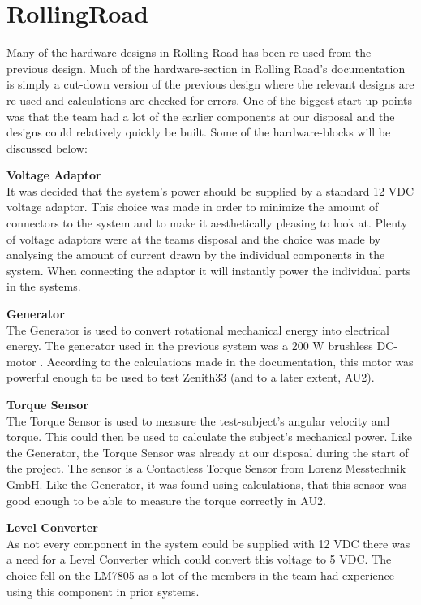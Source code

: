\section{RollingRoad} 
Many of the hardware-designs in Rolling Road has been re-used from the previous design\cite{BAC_rullefelt}. Much of the hardware-section in Rolling Road's documentation\cite{RR} is simply a cut-down version of the previous design where the relevant designs are re-used and calculations are checked for errors. One of the biggest start-up points was that the team had a lot of the earlier components at our disposal and the designs could relatively quickly be built. Some of the hardware-blocks will be discussed below:

\textbf{Voltage Adaptor}\\ 
It was decided that the system's power should be supplied by a standard 12 VDC voltage adaptor. This choice was made in order to minimize the amount of connectors to the system and to make it aesthetically pleasing to look at. Plenty of voltage adaptors were at the teams disposal and the choice was made by analysing the amount of current drawn by the individual components in the system. When connecting the adaptor it will instantly power the individual parts in the systems.

\textbf{Generator}\\
The Generator is used to convert rotational mechanical energy into electrical energy. The generator used in the previous system\cite{BAC_rullefelt} was a 200 W brushless DC-motor \cite{Maxon}. According to the calculations made in the documentation\cite{RR}, this motor was powerful enough to be used to test Zenith33\cite{BAC_zenith33} (and to a later extent, AU2).

\textbf{Torque Sensor}\\
The Torque Sensor is used to measure the test-subject's angular velocity and torque. This could then be used to calculate the subject's mechanical power. Like the Generator, the Torque Sensor was already at our disposal during the start of the project. The sensor is a Contactless Torque Sensor from Lorenz Messtechnik GmbH\cite{TorqueSensor}. Like the Generator, it was found using calculations, that this sensor was good enough to be able to measure the torque correctly in AU2.

\textbf{Level Converter}\\
As not every component in the system could be supplied with 12 VDC there was a need for a Level Converter which could convert this voltage to 5 VDC. The choice fell on the LM7805\cite{LM7805} as a lot of the members in the team had experience using this component in prior systems.

